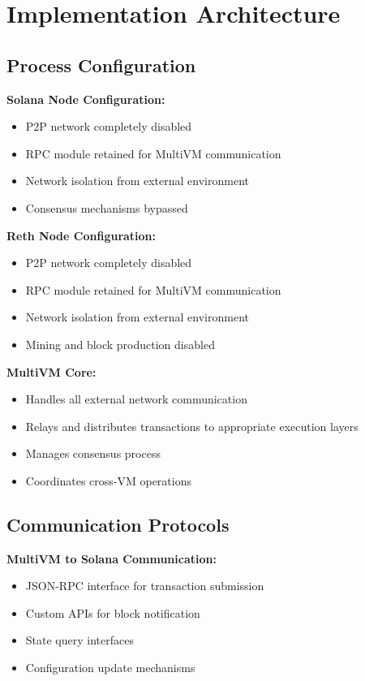 \documentclass[11pt,a4paper]{article}
\begin{document}
\section{Implementation Architecture}

\subsection{Process Configuration}

\textbf{Solana Node Configuration:}
\begin{itemize}
    \item P2P network completely disabled
    \item RPC module retained for MultiVM communication
    \item Network isolation from external environment
    \item Consensus mechanisms bypassed
\end{itemize}

\textbf{Reth Node Configuration:}
\begin{itemize}
    \item P2P network completely disabled
    \item RPC module retained for MultiVM communication
    \item Network isolation from external environment
    \item Mining and block production disabled
\end{itemize}

\textbf{MultiVM Core:}
\begin{itemize}
    \item Handles all external network communication
    \item Relays and distributes transactions to appropriate execution layers
    \item Manages consensus process
    \item Coordinates cross-VM operations
\end{itemize}

\subsection{Communication Protocols}

\textbf{MultiVM to Solana Communication:}
\begin{itemize}
    \item JSON-RPC interface for transaction submission
    \item Custom APIs for block notification
    \item State query interfaces
    \item Configuration update mechanisms
\end{itemize}
\end{document}
